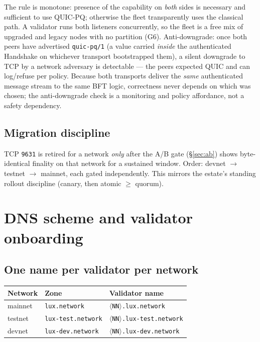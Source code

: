 \documentclass[11pt,a4paper]{article}
\newcommand{\msg}[1]{\textsf{#1}}
\newcommand{\code}[1]{\texttt{#1}}
\begin{document}
The rule is monotone: presence of the capability on \emph{both} sides is
necessary and sufficient to use QUIC-PQ; otherwise the fleet
transparently uses the classical path. A validator runs both listeners
concurrently, so the fleet is a free mix of upgraded and legacy nodes
with no partition (G6). Anti-downgrade: once both peers have advertised
\code{quic-pq/1} (a value carried \emph{inside} the authenticated
\msg{Handshake} on whichever transport bootstrapped them), a silent
downgrade to TCP by a network adversary is detectable --- the peers
expected QUIC and can log/refuse per policy. Because both transports
deliver the \emph{same} authenticated message stream to the same BFT
logic, correctness never depends on which was chosen; the anti-downgrade
check is a monitoring and policy affordance, not a safety dependency.

\subsection{Migration discipline}

TCP \code{9631} is retired for a network \emph{only} after the A/B gate
(\S\ref{sec:ab}) shows byte-identical finality on that network for a
sustained window. Order: devnet $\to$ testnet $\to$ mainnet, each
gated independently. This mirrors the estate's standing rollout
discipline (canary, then atomic $\ge$ quorum).

\section{DNS scheme and validator onboarding}\label{sec:dns}

\subsection{One name per validator per network}

\begin{center}\small
\begin{tabular}{@{}lll@{}}
\toprule
\textbf{Network} & \textbf{Zone} & \textbf{Validator name} \\
\midrule
mainnet & \code{lux.network} & \code{$\langle$NN$\rangle$.lux.network} \\
testnet & \code{lux-test.network} & \code{$\langle$NN$\rangle$.lux-test.network} \\
devnet  & \code{lux-dev.network} & \code{$\langle$NN$\rangle$.lux-dev.network} \\
\bottomrule
\end{tabular}
\end{center}
\end{document}

